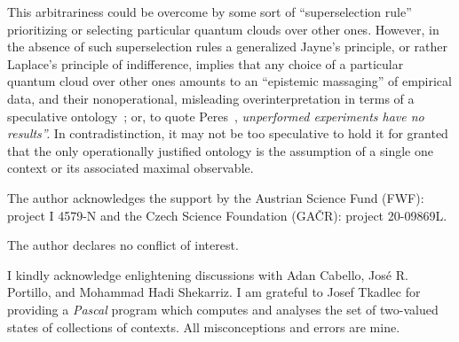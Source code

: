 \documentclass[%
  reprint,
  twocolumn,
 showpacs,
 showkeys,
 preprintnumbers,
 amsmath,amssymb,
 aps,
  prl,
  longbibliography,
 ]{revtex4-1}
\begin{document}
This arbitrariness could be overcome by some sort of ``superselection rule''
prioritizing or selecting particular quantum clouds over other ones.
However, in the absence of such superselection rules a generalized Jayne's principle, or rather Laplace's principle of indifference,
implies that any choice of a particular quantum cloud over other ones
amounts to an ``epistemic massaging'' of empirical data, and their nonoperational,
misleading overinterpretation in terms of a speculative ontology~\cite{berkeley,stace,Goldschmidt2017-idealism};
or, to quote Peres~\cite{peres222}, {\em unperformed experiments have no results''.}
In contradistinction, it may not be too speculative to hold it for granted that the only operationally
justified ontology is the assumption of a single one context or its associated maximal observable.

\begin{acknowledgments}
The author acknowledges the support by the Austrian Science Fund (FWF): project I 4579-N and the Czech Science Foundation (GA\v CR): project 20-09869L.

The author declares no conflict of interest.

I kindly acknowledge enlightening discussions with Adan Cabello, Jos\'{e} R. Portillo, and Mohammad Hadi Shekarriz.
I am grateful to Josef Tkadlec for providing a {\em Pascal} program
which computes and analyses the set of two-valued states of collections of contexts.
All misconceptions and errors are mine.
\end{acknowledgments}







\end{document}
